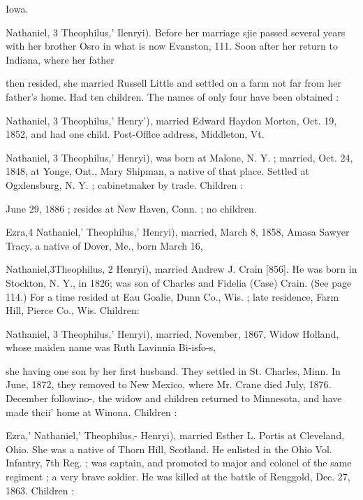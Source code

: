 \documentclass[oneside]{book}
\begin{document}
Iowa. 


Nathaniel, 3 Theophilus,' Ilenryi). Before her marriage sjie 
passed several years with her brother Osro in what is now 
Evanston, 111. Soon after her return to Indiana, where her father 




then resided, she married Russell Little and settled on a farm not 
far from her father's home. Had ten children. The names of 
only four have been obtained : 





Nathaniel, 3 Theophilus,' Henry'), married Edward Haydon 
Morton, Oct. 19, 1852, and had one child. Post-Offlce address, 
Middleton, Vt. 


Nathaniel, 3 Theophilus,' Henryi), was born at Malone, N. Y. ; 
married, Oct. 24, 1848, at Yonge, Ont., Mary Shipman, a native 
of that place. Settled at Ogxlensburg, N. Y. ; cabinetmaker by 
trade. Children : 

June 29, 1886 ; resides at New Haven, Conn. ; no children. 

Ezra,4 Nathaniel,' Theophilus,' Henryi), married, March 8, 1858, 
Amasa Sawyer Tracy, a native of Dover, Me., born March 16, 








Nathaniel,3Theophilus, 2 Henryi), married Andrew J. Crain [856]. 
He was born in Stockton, N. Y., in 1826; was son of Charles 
and Fidelia (Case) Crain. (See page 114.) For a time resided 
at Eau Goalie, Dunn Co., Wis. ; late residence, Farm Hill, Pierce 
Co., Wis. Children: 





Nathaniel, 3 Theophilus,' Henryi), married, November, 1867, 
Widow Holland, whose maiden name was Ruth Lavinnia Bi-isfo-s, 




she having one son by her first husband. They settled in St. 
Charles, Minn. In June, 1872, they removed to New Mexico, 
where Mr. Crane died July, 1876. December followino-, the 
widow and children returned to Minnesota, and have made thcii' 
home at Winona. Children : 





Ezra,' Nathaniel,' Theophilus,- Henryi), married Esther L. 
Portis at Cleveland, Ohio. She was a native of Thorn Hill, 
Scotland. He enlisted in the Ohio Vol. Infantry, 7th Reg. ; was 
captain, and promoted to major and colonel of the same regiment ; 
a very brave soldier. He was killed at the battle of Renggold, 
Dec. 27, 1863. Children : 
\end{document}
